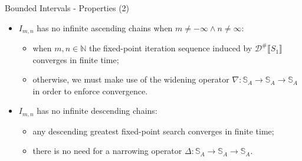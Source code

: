 \begin{frame}{Bounded Intervals - Properties (2)}
    \begin{itemize}
        \item $I_{m,n}$ has no infinite ascending chains when $m \neq -\infty \land n \neq \infty$:
        \begin{itemize}
            \item when $m,n\in \mathbb{N}$ the fixed-point iteration sequence induced by $\mathcal{D}^{\#}\llbracket S_1 \rrbracket$ converges in finite time;
            \item otherwise, we must make use of the widening operator $\nabla: \mathbb{S}_A \to \mathbb{S}_A \to\mathbb{S}_A$ in order to enforce convergence. 
        \end{itemize}
        \item $I_{m,n}$ has no infinite descending chains:
        \begin{itemize}
            \item any descending greatest fixed-point search converges in finite time;
            \item there is no need for a narrowing operator $\Delta: \mathbb{S}_A \to \mathbb{S}_A \to\mathbb{S}_A$.
        \end{itemize}
    \end{itemize}
    
\end{frame}